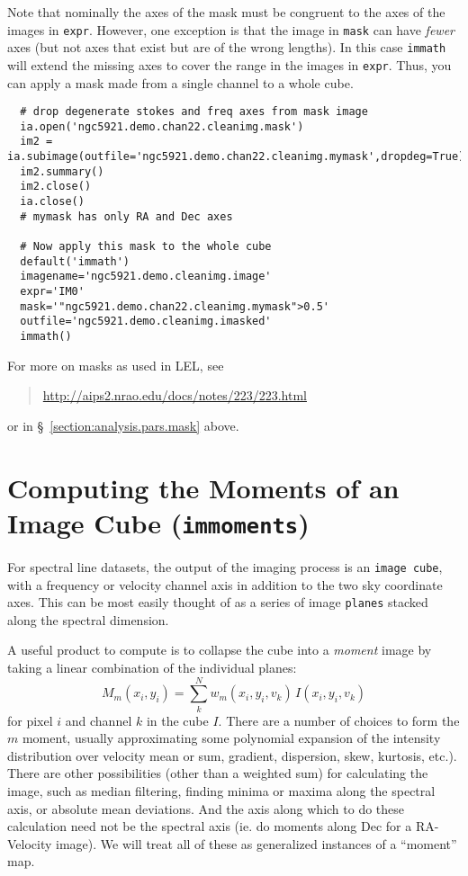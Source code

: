Note that nominally the axes of the mask must be congruent to the axes
of the images in {\tt expr}.  However, one exception is that the image
in {\tt mask} can have {\em fewer} axes (but not axes that exist but
are of the wrong lengths).  In this case {\tt immath} will extend the
missing axes to cover the range in the images in {\tt expr}.
Thus, you can apply a mask made from a single channel to a whole cube.
\small
\begin{verbatim}
  # drop degenerate stokes and freq axes from mask image
  ia.open('ngc5921.demo.chan22.cleanimg.mask')
  im2 = ia.subimage(outfile='ngc5921.demo.chan22.cleanimg.mymask',dropdeg=True)
  im2.summary()
  im2.close()
  ia.close()
  # mymask has only RA and Dec axes

  # Now apply this mask to the whole cube
  default('immath')
  imagename='ngc5921.demo.cleanimg.image'
  expr='IM0'
  mask='"ngc5921.demo.chan22.cleanimg.mymask">0.5'
  outfile='ngc5921.demo.cleanimg.imasked'
  immath()
\end{verbatim}
\normalsize

For more on masks as used in LEL, see
\begin{quote}
   \url{http://aips2.nrao.edu/docs/notes/223/223.html}
\end{quote}
or in \S~\ref{section:analysis.pars.mask} above.





\section{Computing the Moments of an Image Cube ({\tt immoments})}
\label{section:analysis.moments}

For spectral line datasets, the output of the imaging process is an
{\tt image cube}, with a frequency or velocity channel axis in
addition to the two sky coordinate axes.  This can be most easily
thought of as a series of image {\tt planes} stacked along the
spectral dimension.

A useful product to compute is to collapse the cube into a 
{\it moment} image by taking a linear combination of the individual
planes:
\begin{equation}
   M_m(x_i,y_i) = \sum_k^N w_m(x_i,y_i,v_k)\,I(x_i,y_i,v_k)
\end{equation}
for pixel $i$ and channel $k$ in the cube $I$.  There are a number
of choices to form the $m$ moment, usually approximating some
polynomial expansion of the intensity distribution over velocity
mean or sum, gradient, dispersion, skew, kurtosis, etc.).  There
are other possibilities (other than a weighted sum) for calculating
the image, such as median filtering, finding minima or maxima along
the spectral axis, or absolute mean deviations.  And the axis along
which to do these calculation need not be the spectral axis (ie.
do moments along Dec for a RA-Velocity image).  We will treat all
of these as generalized instances of a ``moment'' map.

